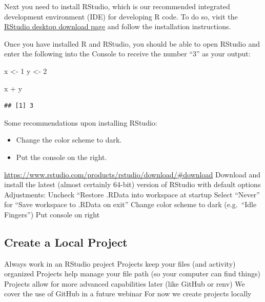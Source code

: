 \documentclass[
]{book}
\newenvironment{Shaded}{\begin{snugshade}}{\end{snugshade}}
\newcommand{\DecValTok}[1]{\textcolor[rgb]{0.00,0.00,0.81}{#1}}
\newcommand{\NormalTok}[1]{#1}
\newcommand{\OtherTok}[1]{\textcolor[rgb]{0.56,0.35,0.01}{#1}}
\newcommand{\SpecialCharTok}[1]{\textcolor[rgb]{0.00,0.00,0.00}{#1}}
\providecommand{\tightlist}{%
  \setlength{\itemsep}{0pt}\setlength{\parskip}{0pt}}
\begin{document}
Next you need to install RStudio, which is our recommended integrated development environment (IDE) for developing R code. To do so, visit the \href{https://rstudio.com/products/rstudio/download/}{RStudio desktop download page} and follow the installation instructions.

Once you have installed R and RStudio, you should be able to open RStudio and enter the following into the Console to receive the number ``3'' as your output:

\begin{Shaded}
\begin{Highlighting}[]
\NormalTok{x }\OtherTok{\textless{}{-}} \DecValTok{1}
\NormalTok{y }\OtherTok{\textless{}{-}} \DecValTok{2}

\NormalTok{x }\SpecialCharTok{+}\NormalTok{ y}
\end{Highlighting}
\end{Shaded}

\begin{verbatim}
## [1] 3
\end{verbatim}

Some recommendations upon installing RStudio:

\begin{itemize}
\tightlist
\item
  Change the color scheme to dark.
\item
  Put the console on the right.
\end{itemize}

\url{https://www.rstudio.com/products/rstudio/download/\#download}
Download and install the latest (almost certainly 64-bit) version of RStudio with default options
Adjustments:
Uncheck ``Restore .RData into workspace at startup
Select ``Never'' for ``Save workspace to .RData on exit''
Change color scheme to dark (e.g.~``Idle Fingers'')
Put console on right

\hypertarget{create-a-local-project}{%
\subsection{Create a Local Project}\label{create-a-local-project}}

Always work in an RStudio project
Projects keep your files (and activity) organized
Projects help manage your file path (so your computer can find things)
Projects allow for more advanced capabilities later (like GitHub or renv)
We cover the use of GitHub in a future webinar
For now we create projects locally
\end{document}
